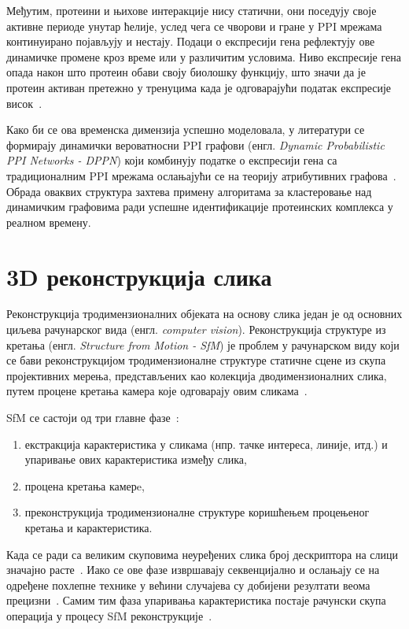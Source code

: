 Међутим, протеини и њихове интеракције нису статични, они поседују своје активне периоде унутар ћелије, услед чега се чворови и гране у PPI мрежама континуирано појављују и нестају. Подаци о експресији гена рефлектују ове динамичке промене кроз време или у различитим условима. Ниво експресије гена опада након што протеин обави своју биолошку функцију, што значи да је протеин активан претежно у тренуцима када је одговарајући податак експресије висок~\cite{zhangConstructionDynamicProbabilistic2016}.

Како би се ова временска димензија успешно моделовала, у литератури се формирају динамички вероватносни PPI графови (енгл. \textit{Dynamic Probabilistic PPI Networks - DPPN}) који комбинују податке о експресији гена са традиционалним PPI мрежама ослањајући се на теорију атрибутивних графова~\cite{zhangConstructionDynamicProbabilistic2016}. Обрада оваквих структура захтева примену алгоритама за кластеровање над динамичким графовима ради успешне идентификације протеинских комплекса у реалном времену.

\section{3D реконструкција слика}

Реконструкција тродимензионалних објеката на основу слика један је од основних циљева рачунарског вида (енгл. \textit{computer vision}). Реконструкција структуре из кретања (енгл. \textit{Structure from Motion - SfM}) је проблем у рачунарском виду који се бави реконструкцијом тродимензионалне структуре статичне сцене из скупа пројективних мерења, представљених као колекција дводимензионалних слика, путем процене кретања камера које одговарају овим сликама~\cite{ozyesilSurveyStructureMotion2017}.

SfM се састоји од три главне фазе~\cite{ozyesilSurveyStructureMotion2017}:
\begin{enumerate}
    \item екстракција карактеристика у сликама (нпр. тачке интереса, линије, итд.) и упаривање ових карактеристика између слика,
    \item процена кретања камерe,
    \item преконструкција тродимензионалне структуре коришћењем процењеног кретања и карактеристика.
\end{enumerate}

Када се ради са великим скуповима неуређених слика број дескриптора на слици значајно расте~\cite{shenGraphBasedConsistentMatching2016}. Иако се ове фазе извршавају секвенцијално и ослањају се на одређене похлепне технике у већини случајева су добијени резултати веома прецизни~\cite{ozyesilSurveyStructureMotion2017}. Самим тим фаза упаривања карактеристика постаје рачунски скупа операција у процесу SfM реконструкције~\cite{shenGraphBasedConsistentMatching2016}.

